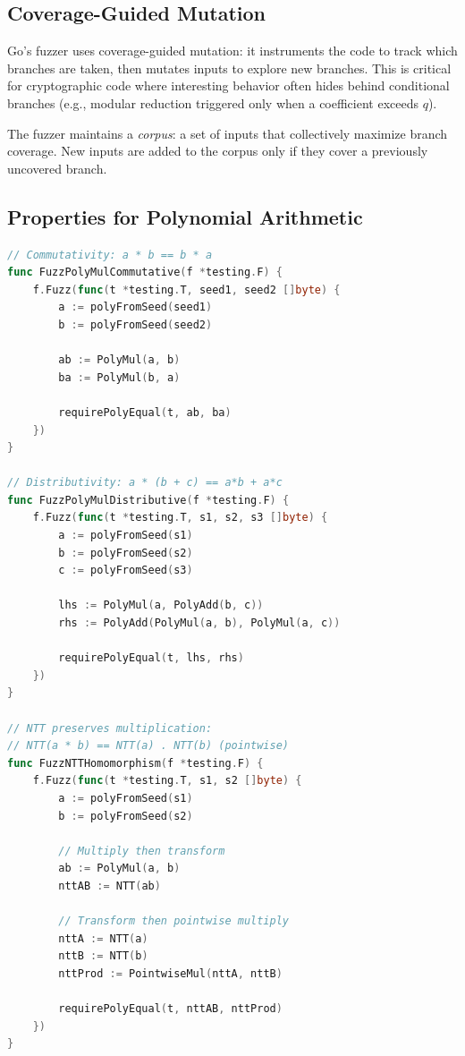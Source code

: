 \subsection{Coverage-Guided Mutation}

Go's fuzzer uses coverage-guided mutation: it instruments the code to track which
branches are taken, then mutates inputs to explore new branches. This is critical for
cryptographic code where interesting behavior often hides behind conditional branches
(e.g., modular reduction triggered only when a coefficient exceeds $q$).

The fuzzer maintains a \emph{corpus}: a set of inputs that collectively maximize branch
coverage. New inputs are added to the corpus only if they cover a previously uncovered
branch.

\subsection{Properties for Polynomial Arithmetic}

\begin{lstlisting}[language=Go,caption={Property-based fuzz tests for polynomial arithmetic}]
// Commutativity: a * b == b * a
func FuzzPolyMulCommutative(f *testing.F) {
    f.Fuzz(func(t *testing.T, seed1, seed2 []byte) {
        a := polyFromSeed(seed1)
        b := polyFromSeed(seed2)

        ab := PolyMul(a, b)
        ba := PolyMul(b, a)

        requirePolyEqual(t, ab, ba)
    })
}

// Distributivity: a * (b + c) == a*b + a*c
func FuzzPolyMulDistributive(f *testing.F) {
    f.Fuzz(func(t *testing.T, s1, s2, s3 []byte) {
        a := polyFromSeed(s1)
        b := polyFromSeed(s2)
        c := polyFromSeed(s3)

        lhs := PolyMul(a, PolyAdd(b, c))
        rhs := PolyAdd(PolyMul(a, b), PolyMul(a, c))

        requirePolyEqual(t, lhs, rhs)
    })
}

// NTT preserves multiplication:
// NTT(a * b) == NTT(a) . NTT(b) (pointwise)
func FuzzNTTHomomorphism(f *testing.F) {
    f.Fuzz(func(t *testing.T, s1, s2 []byte) {
        a := polyFromSeed(s1)
        b := polyFromSeed(s2)

        // Multiply then transform
        ab := PolyMul(a, b)
        nttAB := NTT(ab)

        // Transform then pointwise multiply
        nttA := NTT(a)
        nttB := NTT(b)
        nttProd := PointwiseMul(nttA, nttB)

        requirePolyEqual(t, nttAB, nttProd)
    })
}
\end{lstlisting}

